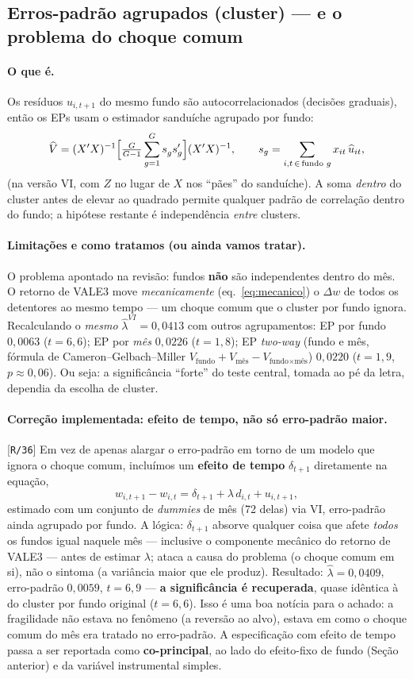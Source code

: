 \documentclass[11pt,a4paper]{article}
\newcommand{\oquee}[0]{\paragraph{O que é.}}
\newcommand{\limitacoes}[0]{\paragraph{Limitações e como tratamos (ou ainda vamos tratar).}}
\newcommand{\scriptref}[1]{{\footnotesize\color{cinza}[\texttt{#1}]}}
\begin{document}
\subsection{Erros-padrão agrupados (cluster) --- e o problema do choque comum}
\label{sec:cluster}

\oquee Os resíduos $u_{i,t+1}$ do mesmo fundo são autocorrelacionados (decisões graduais), então
os EPs usam o estimador sanduíche agrupado por fundo:
\begin{equation}
\widehat V = (X'X)^{-1}\Big[\tfrac{G}{G-1}\sum_{g=1}^{G} s_g^{\vphantom{\prime}} s_g'\Big](X'X)^{-1},
\qquad s_g = \sum_{i,t\,\in\,\text{fundo }g} x_{it}\,\widehat u_{it},
\end{equation}
(na versão VI, com $Z$ no lugar de $X$ nos ``pães'' do sanduíche). A soma \emph{dentro} do cluster
antes de elevar ao quadrado permite qualquer padrão de correlação dentro do fundo; a hipótese
restante é independência \emph{entre} clusters.

\limitacoes O problema apontado na revisão: fundos \textbf{não} são independentes dentro do
mês. O retorno de VALE3 move \emph{mecanicamente} (eq.~\ref{eq:mecanico}) o $\Delta w$ de todos os
detentores ao mesmo tempo --- um choque comum que o cluster por fundo ignora. Recalculando o
\emph{mesmo} $\widehat\lambda^{VI}=0{,}0413$ com outros agrupamentos: EP por fundo $0{,}0063$
($t=6{,}6$); EP por \emph{mês} $0{,}0226$ ($t=1{,}8$); EP \emph{two-way} (fundo e mês, fórmula de
Cameron--Gelbach--Miller $V_{\text{fundo}}+V_{\text{mês}}-V_{\text{fundo}\times\text{mês}}$)
$0{,}0220$ ($t=1{,}9$, $p\approx0{,}06$). Ou seja: a significância ``forte'' do teste central,
tomada ao pé da letra, dependia da escolha de cluster.

\paragraph{Correção implementada: efeito de tempo, não só erro-padrão maior.} \scriptref{R/36}
Em vez de apenas alargar o erro-padrão em torno de um modelo que ignora o choque comum,
incluímos um \textbf{efeito de tempo} $\delta_{t+1}$ diretamente na equação,
\begin{equation}
w_{i,t+1}-w_{i,t} = \delta_{t+1} + \lambda\,d_{i,t} + u_{i,t+1},
\label{eq:pa_timefe}
\end{equation}
estimado com um conjunto de \emph{dummies} de mês (72 delas) via VI, erro-padrão ainda agrupado
por fundo. A lógica: $\delta_{t+1}$ absorve qualquer coisa que afete \emph{todos} os fundos igual
naquele mês --- inclusive o componente mecânico do retorno de VALE3 --- antes de estimar
$\lambda$; ataca a causa do problema (o choque comum em si), não o sintoma (a variância maior que
ele produz). Resultado: $\widehat\lambda=0{,}0409$, erro-padrão $0{,}0059$, $t=6{,}9$ ---
\textbf{a significância é recuperada}, quase idêntica à do cluster por fundo original
($t=6{,}6$). Isso é uma boa notícia para o achado: a fragilidade não estava no fenômeno (a
reversão ao alvo), estava em como o choque comum do mês era tratado no erro-padrão. A
especificação com efeito de tempo passa a ser reportada como \textbf{co-principal}, ao lado do
efeito-fixo de fundo (Seção anterior) e da variável instrumental simples.
\end{document}
